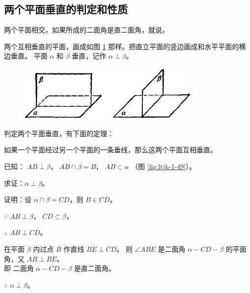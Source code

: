\subsection{两个平面垂直的判定和性质}\label{subsec:1-15}

两个平面相交，如果所成的二面角是直二面角，就说。

两个互相垂直的平面，画成如图 \ref{fig:ltjh-1-48} 那样。把直立平面的竖边画成和水平平面的横边垂直。
平面 $\alpha$ 和 $\beta$ 垂直，记作 $\alpha \perp \beta$。

\begin{figure}[htbp]
    \centering
    \includegraphics[width=9cm]{../pic/ltjh-ch1-48.png}
    \caption{}\label{fig:ltjh-1-48}
\end{figure}

判定两个平面垂直，有下面的定理：

\begin{dingli}[两个平面垂直的判定定理][dl:lgpmcz-pd]
    如果一个平面经过另一个平面的一条垂线，那么这两个平面互相垂直。
\end{dingli}

已知： $AB \perp \beta$， $AB \cap \beta =B$， $AB \subset \alpha$ （图 \ref{fig:ltjh-1-49}）。

求证：$\alpha \perp \beta$。

证明：设 $\alpha \cap \beta = CD$，则 $B \in CD$。

$\because$ \quad $AB \perp \beta$， $CD \subset \beta$，

$\therefore$ \quad $AB \perp CD$。

在平面 $\beta$ 内过点 $B$ 作直线 $BE \perp CD$。
则 $\angle ABE$ 是二面角 $\alpha{-}CD{-}\beta$ 的平面角，又 $AB \perp BE$。\\
即 \quad 二面角 $\alpha{-}CD{-}\beta$ 是直二面角。

$\therefore$ \quad $\alpha \perp \beta$。

